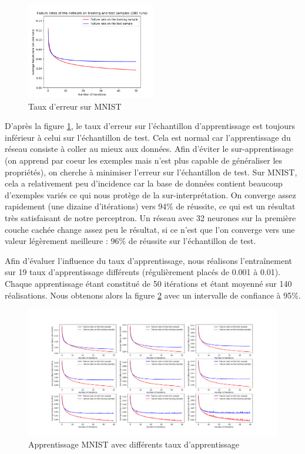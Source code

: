 \begin{figure}[h]
 \centering
 \includegraphics[width=0.5\textwidth]{img/MNIST.png}
 \caption{Taux d'erreur sur MNIST}
 \label{fig:MNIST}
\end{figure}

D'après la figure \ref{fig:MNIST}, le taux d'erreur sur l'échantillon d'apprentissage est toujours inférieur à celui sur l'échantillon de test. Cela est normal car
l'apprentissage du réseau consiste à coller au mieux aux données. Afin d'éviter le sur-apprentissage (on apprend par coeur les exemples mais n'est plus capable de
généraliser les propriétés), on cherche à minimiser l'erreur sur l'échantillon de test. Sur MNIST, cela a relativement peu d'incidence car la base de données contient
beaucoup d'exemples variés ce qui nous protège de la sur-interprétation. On converge assez rapidement (une dizaine d'itérations) vers 94\% de réussite, ce qui est
un résultat très satisfaisant de notre perceptron. Un réseau avec 32 neurones sur la première couche cachée change assez peu le résultat, si ce n'est que 
l'on converge vers une valeur légèrement meilleure : 96\% de réussite sur l'échantillon de test.

Afin d'évaluer l'influence du taux d'apprentissage, nous réalisons l'entraînement sur 19 taux d'apprentissage différents (régulièrement placés de 0.001 à 0.01). Chaque apprentissage
étant constitué de 50 itérations et étant moyenné sur 140 réalisations. Nous obtenons alors la figure \ref{fig:MNIST_difLR} avec un intervalle de confiance à 95\%.

\begin{figure}[ht]
 \centering
 \includegraphics[width=\textwidth]{img/MNIST_difLR.png}
 \caption{Apprentissage MNIST avec différents taux d'apprentissage}
 \label{fig:MNIST_difLR}
\end{figure}

